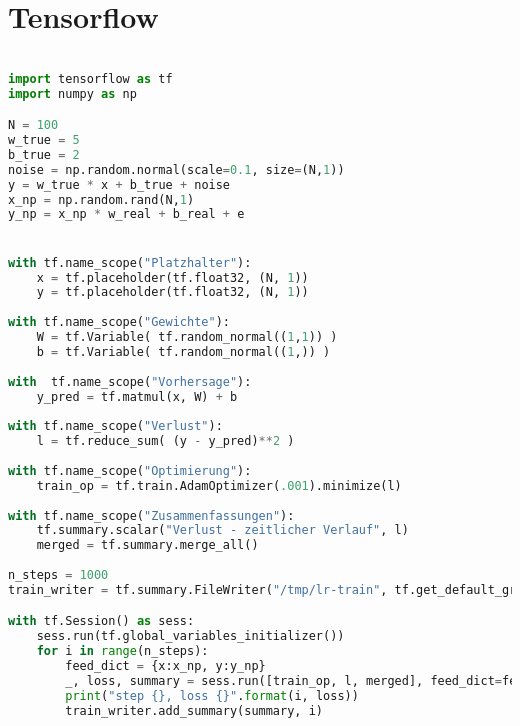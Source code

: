 \section{Tensorflow}

\begin{lstlisting}[language=python]

import tensorflow as tf
import numpy as np

N = 100
w_true = 5
b_true = 2
noise = np.random.normal(scale=0.1, size=(N,1))
y = w_true * x + b_true + noise
x_np = np.random.rand(N,1)
y_np = x_np * w_real + b_real + e


with tf.name_scope("Platzhalter"):
    x = tf.placeholder(tf.float32, (N, 1))
    y = tf.placeholder(tf.float32, (N, 1))
    
with tf.name_scope("Gewichte"):
    W = tf.Variable( tf.random_normal((1,1)) )
    b = tf.Variable( tf.random_normal((1,)) )
    
with  tf.name_scope("Vorhersage"):
    y_pred = tf.matmul(x, W) + b
    
with tf.name_scope("Verlust"):
    l = tf.reduce_sum( (y - y_pred)**2 )
    
with tf.name_scope("Optimierung"):
    train_op = tf.train.AdamOptimizer(.001).minimize(l)
    
with tf.name_scope("Zusammenfassungen"):
    tf.summary.scalar("Verlust - zeitlicher Verlauf", l)
    merged = tf.summary.merge_all()
    
n_steps = 1000
train_writer = tf.summary.FileWriter("/tmp/lr-train", tf.get_default_graph())

with tf.Session() as sess:
    sess.run(tf.global_variables_initializer())
    for i in range(n_steps):
        feed_dict = {x:x_np, y:y_np}
        _, loss, summary = sess.run([train_op, l, merged], feed_dict=feed_dict)
        print("step {}, loss {}".format(i, loss))
        train_writer.add_summary(summary, i)
        

\end{lstlisting}
